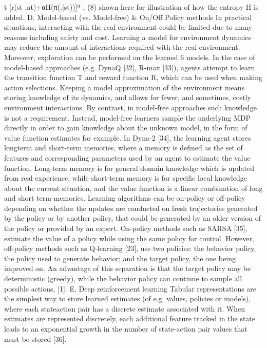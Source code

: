 t
[r(st
,at)+αH(π(.|st))]ª
, (8)
shown here for illustration of how the entropy H is added.
D. Model-based (vs. Model-free) & On/Off Policy methods
In practical situations, interacting with the real environment
could be limited due to many reasons including safety and
cost. Learning a model for environment dynamics may reduce
the amount of interactions required with the real environment. Moreover, exploration can be performed on the learned
6
models. In the case of model-based approaches (e.g. DynaQ [32], R-max [33]), agents attempt to learn the transition
function T and reward function R, which can be used when
making action selections. Keeping a model approximation of
the environment means storing knowledge of its dynamics, and
allows for fewer, and sometimes, costly environment interactions. By contrast, in model-free approaches such knowledge
is not a requirement. Instead, model-free learners sample the
underlying MDP directly in order to gain knowledge about
the unknown model, in the form of value function estimates
for example. In Dyna-2 [34], the learning agent stores longterm and short-term memories, where a memory is defined
as the set of features and corresponding parameters used by
an agent to estimate the value function. Long-term memory
is for general domain knowledge which is updated from real
experience, while short-term memory is for specific local
knowledge about the current situation, and the value function
is a linear combination of long and short term memories.
Learning algorithms can be on-policy or off-policy depending on whether the updates are conducted on fresh trajectories
generated by the policy or by another policy, that could be
generated by an older version of the policy or provided by an
expert. On-policy methods such as SARSA [35], estimate the
value of a policy while using the same policy for control.
However, off-policy methods such as Q-learning [23], use
two policies: the behavior policy, the policy used to generate
behavior; and the target policy, the one being improved on. An
advantage of this separation is that the target policy may be
deterministic (greedy), while the behavior policy can continue
to sample all possible actions, [1].
E. Deep reinforcement learning
Tabular representations are the simplest way to store learned
estimates (of e.g. values, policies or models), where each stateaction pair has a discrete estimate associated with it. When
estimates are represented discretely, each additional feature
tracked in the state leads to an exponential growth in the
number of state-action pair values that must be stored [36].
